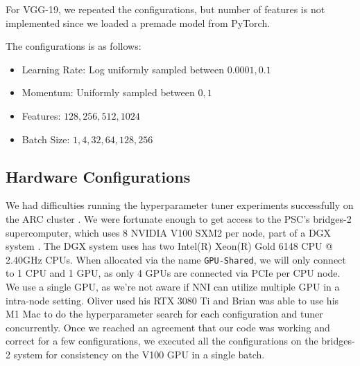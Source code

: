 \documentclass{article}
\begin{document}
For VGG-19, we repeated the configurations, but number of features is not implemented since we loaded a premade model from PyTorch.

The configurations is as follows:
\begin{itemize}
    \item Learning Rate: Log uniformly sampled between $0.0001, 0.1$
    \item Momentum: Uniformly sampled between $0, 1$
    \item Features: $128, 256, 512, 1024$
    \item Batch Size: $1, 4, 32, 64, 128, 256$
\end{itemize}

\subsection{Hardware Configurations}
We had difficulties running the hyperparameter tuner experiments successfully on the ARC cluster \cite{arc}. We were fortunate enough to get access to the PSC's bridges-2 supercomputer, which uses 8 NVIDIA V100 SXM2 per node, part of a DGX system \cite{v100, bridges-2}. The DGX system uses has two Intel(R) Xeon(R) Gold 6148 CPU @ 2.40GHz CPUs. When allocated via the name \verb|GPU-Shared|, we will only connect to 1 CPU and 1 GPU, as only 4 GPUs are connected via PCIe per CPU node. We use a single GPU, as we're not aware if NNI can utilize multiple GPU in a intra-node setting. Oliver used his RTX 3080 Ti and Brian was able to use his M1 Mac to do the hyperparameter search for each configuration and tuner concurrently. Once we reached an agreement that our code was working and correct for a few configurations, we executed all the configurations on the bridges-2 system for consistency on the V100 GPU in a single batch. 
\end{document}
